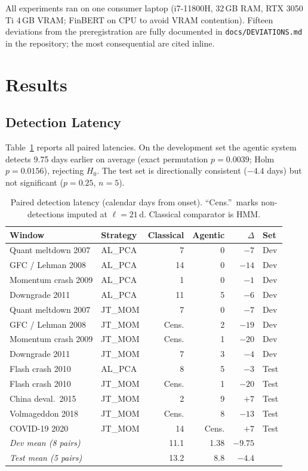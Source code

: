 \documentclass[10pt,a4paper]{article}
\begin{document}
All experiments ran on one consumer laptop (i7-11800H, 32\,GB RAM, RTX 3050 Ti
4\,GB VRAM; FinBERT on CPU to avoid VRAM contention). Fifteen deviations from
the preregistration are fully documented in \texttt{docs/DEVIATIONS.md} in the
repository; the most consequential are cited inline.

\section{Results}\label{sec:results}

\subsection{Detection Latency}\label{sec:results-latency}

Table~\ref{tab:latency} reports all paired latencies. On the development set
the agentic system detects 9.75 days earlier on average (exact permutation
$p = 0.0039$; Holm $p = 0.0156$), rejecting $H_0$. The test set is
directionally consistent ($-4.4$ days) but not significant ($p = 0.25$,
$n = 5$).

\begin{table}[htbp]
\centering
\footnotesize
\caption{Paired detection latency (calendar days from onset). ``Cens.''\ marks
non-detections imputed at $\ell = 21$\,d. Classical comparator is HMM.}
\label{tab:latency}
\begin{tabular}{llrrrl}
\toprule
Window & Strategy & Classical & Agentic & $\Delta$ & Set \\
\midrule
Quant meltdown 2007  & AL\_PCA & 7  & 0  & $-7$  & Dev \\
GFC / Lehman 2008    & AL\_PCA & 14 & 0  & $-14$ & Dev \\
Momentum crash 2009  & AL\_PCA & 1  & 0  & $-1$  & Dev \\
Downgrade 2011       & AL\_PCA & 11 & 5  & $-6$  & Dev \\
Quant meltdown 2007  & JT\_MOM & 7  & 0  & $-7$  & Dev \\
GFC / Lehman 2008    & JT\_MOM & Cens. & 2  & $-19$ & Dev \\
Momentum crash 2009  & JT\_MOM & Cens. & 1  & $-20$ & Dev \\
Downgrade 2011       & JT\_MOM & 7  & 3  & $-4$  & Dev \\
\addlinespace
Flash crash 2010     & AL\_PCA & 8  & 5  & $-3$  & Test \\
Flash crash 2010     & JT\_MOM & Cens. & 1  & $-20$ & Test \\
China deval.\ 2015   & JT\_MOM & 2  & 9  & $+7$  & Test \\
Volmageddon 2018     & JT\_MOM & Cens. & 8  & $-13$ & Test \\
COVID-19 2020        & JT\_MOM & 14 & Cens. & $+7$  & Test \\
\midrule
\multicolumn{2}{l}{\emph{Dev mean (8 pairs)}} & 11.1 & 1.38 & $-9.75$ & \\
\multicolumn{2}{l}{\emph{Test mean (5 pairs)}} & 13.2 & 8.8 & $-4.4$ & \\
\bottomrule
\end{tabular}
\end{table}
\end{document}
